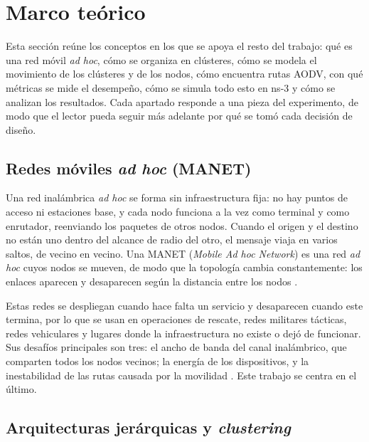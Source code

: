 \section{Marco teórico}
\label{sec:marco}

Esta sección reúne los conceptos en los que se apoya el resto del trabajo: qué es una
red móvil \emph{ad hoc}, cómo se organiza en clústeres, cómo se modela el movimiento de
los clústeres y de los nodos, cómo encuentra rutas AODV, con qué métricas se mide el
desempeño, cómo se simula todo esto en ns-3 y cómo se analizan los resultados. Cada
apartado responde a una pieza del experimento, de modo que el lector pueda seguir más
adelante por qué se tomó cada decisión de diseño.

\subsection{Redes móviles \emph{ad hoc} (MANET)}
\label{sec:marco-manet}

Una red inalámbrica \emph{ad hoc} se forma sin infraestructura fija: no hay puntos de
acceso ni estaciones base, y cada nodo funciona a la vez como terminal y como enrutador,
reenviando los paquetes de otros nodos. Cuando el origen y el destino no están uno
dentro del alcance de radio del otro, el mensaje viaja en varios saltos, de vecino en
vecino. Una MANET (\emph{Mobile Ad hoc Network}) es una red \emph{ad hoc} cuyos nodos se
mueven, de modo que la topología cambia constantemente: los enlaces aparecen y
desaparecen según la distancia entre los nodos \cite{sarkar2013adhoc}.

Estas redes se despliegan cuando hace falta un servicio y desaparecen cuando este
termina, por lo que se usan en operaciones de rescate, redes militares tácticas, redes
vehiculares y lugares donde la infraestructura no existe o dejó de funcionar. Sus
desafíos principales son tres: el ancho de banda del canal inalámbrico, que comparten
todos los nodos vecinos; la energía de los dispositivos, y la inestabilidad de las rutas
causada por la movilidad \cite{sarkar2013adhoc}. Este trabajo se centra en el último.

\subsection{Arquitecturas jerárquicas y \emph{clustering}}
\label{sec:marco-jerarquia}

